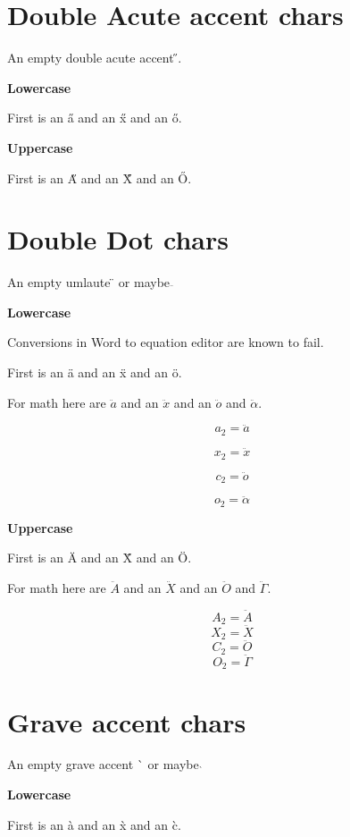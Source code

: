 \documentclass{article}
\begin{document}
\section{Double Acute accent chars}

An empty double acute accent \H{}.

\textbf{Lowercase}

First is an \H{a} and an \H{x} and an \H{o}.

\textbf{Uppercase}

First is an \H{A} and an \H{X} and an \H{O}.




\section{Double Dot chars}

An empty umlaute \"{} or maybe $\ddot{}$

\textbf{Lowercase}

Conversions in Word to equation editor are known to fail. 

First is an \"{a} and an \"{x} and an \"{o}.

For math here are $\ddot{a}$ and an $\ddot{x}$ and an $\ddot{o}$ and $\ddot{\alpha}$.

$$a_2=\ddot{a}$$

$$x_2=\ddot{x}$$

$$c_2=\ddot{o}$$

$$o_2=\ddot{\alpha}$$

\textbf{Uppercase}

First is an \"{A} and an \"{X} and an \"{O}.

For math here are $\ddot{A}$ and an $\ddot{X}$ and an $\ddot{O}$ and $\ddot{\Gamma}$.

$$A_2=\ddot{A}$$
$$X_2=\ddot{X}$$
$$C_2=\ddot{O}$$
$$O_2=\ddot{\Gamma}$$




\section{Grave accent chars}

An empty grave accent \`{} or maybe $\grave{}$

\textbf{Lowercase}

First is an \`{a} and an \`{x} and an \`{c}.
\end{document}
